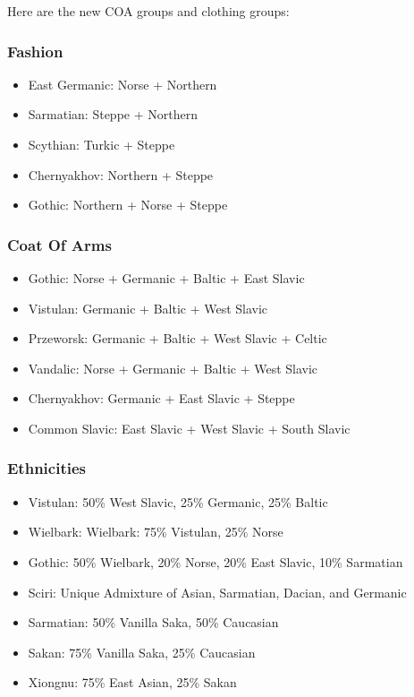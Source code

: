 \documentclass{article}
\begin{document}
	Here are the new COA groups and clothing groups:
	
	\subsubsection{Fashion}
	\begin{itemize}
		\item East Germanic: Norse + Northern
		\item Sarmatian: Steppe + Northern
		\item Scythian: Turkic + Steppe
		\item Chernyakhov: Northern + Steppe
		\item Gothic: Northern + Norse + Steppe
	\end{itemize}
	
	\subsubsection{Coat Of Arms}
	\begin{itemize}
		\item Gothic: Norse + Germanic + Baltic + East Slavic
		\item Vistulan: Germanic + Baltic + West Slavic
		\item Przeworsk: Germanic + Baltic + West Slavic + Celtic
		\item Vandalic: Norse + Germanic + Baltic + West Slavic
		\item Chernyakhov: Germanic + East Slavic + Steppe
		\item Common Slavic: East Slavic + West Slavic + South Slavic
	\end{itemize}
	
	\subsubsection{Ethnicities}
	\begin{itemize}
		\item Vistulan: 50\% West Slavic, 25\% Germanic, 25\% Baltic
		\item Wielbark: Wielbark: 75\% Vistulan, 25\% Norse
		\item Gothic: 50\% Wielbark, 20\% Norse, 20\% East Slavic, 10\% Sarmatian
		\item Sciri: Unique Admixture of Asian, Sarmatian, Dacian, and Germanic
		\item Sarmatian: 50\% Vanilla Saka, 50\% Caucasian
		\item Sakan: 75\% Vanilla Saka, 25\% Caucasian
		\item Xiongnu: 75\% East Asian, 25\% Sakan
	\end{itemize}
	
\end{document}
